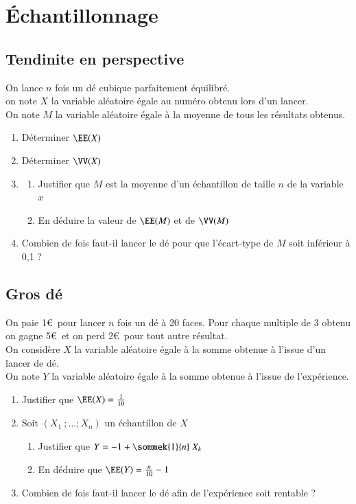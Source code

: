\documentclass[oneside,12pt]{article}          %
\begin{document}
\section{Échantillonnage}

\subsection{Tendinite en perspective}
On lance $n$ fois un dé cubique parfaitement équilibré.\\
on note $X$ la variable aléatoire égale au numéro obtenu lors d'un lancer.\\
On note $M$ la variable aléatoire égale à la moyenne de tous les résultats obtenus.
\begin{enumerate}
    \item Déterminer $\EE(X)$
    \item Déterminer $\VV(X)$
    \item \begin{enumerate}
    	\item Justifier que $M$ est la moyenne d'un échantillon de taille $n$ de la variable $x$
    	\item En déduire la valeur de $\EE(M)$ et de $\VV(M)$
    \end{enumerate}    
    \item Combien de fois faut-il lancer le dé pour que l'écart-type de $M$ soit inférieur à 0,1 ?
\end{enumerate} 



\subsection{Gros dé}
On paie 1\euro\, pour lancer $n$ fois un dé à 20 faces. Pour chaque multiple de 3 obtenu on gagne 5\euro\, et on perd 2\euro\, pour tout autre résultat.\\
On considère $X$ la variable aléatoire égale à la somme obtenue à l'issue d'un lancer de dé.\\
On note $Y$ la variable aléatoire égale à la somme obtenue à l'issue de l'expérience.
\begin{enumerate}
	\item Justifier que $\EE(X)=\frac{1}{10}$
	\item Soit $(X_1~; \ldots ; X_n)$ un échantillon de $X$
	\begin{enumerate}
		\item Justifier que $Y=-1+\sommek{1}{n}~X_k$
		\item En déduire que $\EE(Y)=\frac{n}{10}-1$
	\end{enumerate}
	\item Combien de fois faut-il lancer le dé afin de l'expérience soit rentable ?
\end{enumerate}
\end{document}
